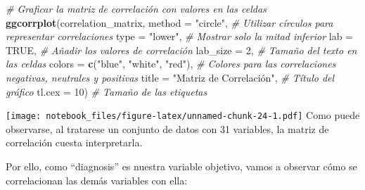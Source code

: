 \documentclass[
]{article}
\newenvironment{Shaded}{\begin{snugshade}}{\end{snugshade}}
\newcommand{\AttributeTok}[1]{\textcolor[rgb]{0.13,0.29,0.53}{#1}}
\newcommand{\CommentTok}[1]{\textcolor[rgb]{0.56,0.35,0.01}{\textit{#1}}}
\newcommand{\ConstantTok}[1]{\textcolor[rgb]{0.56,0.35,0.01}{#1}}
\newcommand{\DecValTok}[1]{\textcolor[rgb]{0.00,0.00,0.81}{#1}}
\newcommand{\FunctionTok}[1]{\textcolor[rgb]{0.13,0.29,0.53}{\textbf{#1}}}
\newcommand{\NormalTok}[1]{#1}
\newcommand{\OtherTok}[1]{\textcolor[rgb]{0.56,0.35,0.01}{#1}}
\newcommand{\SpecialCharTok}[1]{\textcolor[rgb]{0.81,0.36,0.00}{\textbf{#1}}}
\newcommand{\StringTok}[1]{\textcolor[rgb]{0.31,0.60,0.02}{#1}}
\begin{document}
\begin{Shaded}
\begin{Highlighting}[]
\CommentTok{\# Graficar la matriz de correlación con valores en las celdas}
\FunctionTok{ggcorrplot}\NormalTok{(correlation\_matrix, }
           \AttributeTok{method =} \StringTok{"circle"}\NormalTok{,  }\CommentTok{\# Utilizar círculos para representar correlaciones}
           \AttributeTok{type =} \StringTok{"lower"}\NormalTok{,     }\CommentTok{\# Mostrar solo la mitad inferior}
           \AttributeTok{lab =} \ConstantTok{TRUE}\NormalTok{,         }\CommentTok{\# Añadir los valores de correlación}
           \AttributeTok{lab\_size =} \DecValTok{2}\NormalTok{,       }\CommentTok{\# Tamaño del texto en las celdas}
           \AttributeTok{colors =} \FunctionTok{c}\NormalTok{(}\StringTok{"blue"}\NormalTok{, }\StringTok{"white"}\NormalTok{, }\StringTok{"red"}\NormalTok{), }\CommentTok{\# Colores para las correlaciones negativas, neutrales y positivas}
           \AttributeTok{title =} \StringTok{"Matriz de Correlación"}\NormalTok{,  }\CommentTok{\# Título del gráfico}
           \AttributeTok{tl.cex =} \DecValTok{10}\NormalTok{)       }\CommentTok{\# Tamaño de las etiquetas}
\end{Highlighting}
\end{Shaded}

\texttt{[image: notebook\_files/figure-latex/unnamed-chunk-24-1.pdf]}
Como puede observarse, al tratarese un conjunto de datos con 31
variables, la matriz de correlación cuesta interpretarla.

Por ello, como ``diagnosis'' es nuestra variable objetivo, vamos a
observar cómo se correlacionan las demás variables con ella:

\begin{Shaded}
\end{Shaded}
\end{document}
